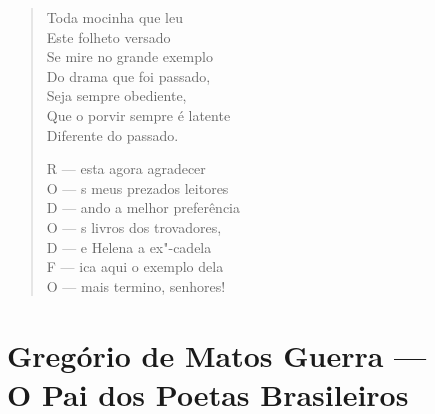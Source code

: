 \begin{verse}
Toda mocinha que leu \\
Este folheto versado \\
Se mire no grande exemplo \\
Do drama que foi passado, \\
Seja sempre obediente, \\
Que o porvir sempre é latente \\
Diferente do passado. 


R --- esta agora agradecer \\
O --- s meus prezados leitores \\
D --- ando a melhor preferência \\
O --- s livros dos trovadores, \\
D --- e Helena a ex"-cadela \\
F --- ica aqui o exemplo dela \\
O --- mais termino, senhores! 
\end{verse}

\chapter[Gregório de Matos Guerra --- O Pai dos Poetas Brasileiros]{Gregório de Matos Guerra ---\\ O Pai dos Poetas Brasileiros }

